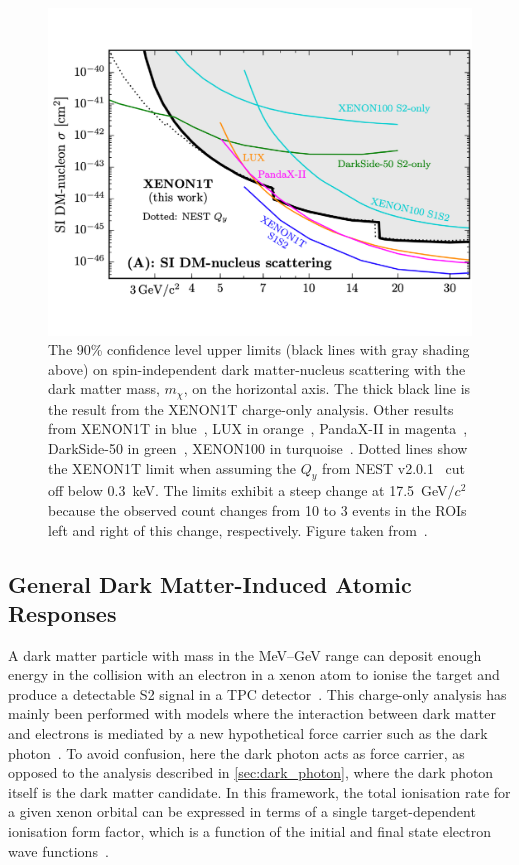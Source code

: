 \begin{figure}[!htbp] 
\begin{center}
\includegraphics[width=0.99\columnwidth]{fig_x1t_subGeV.pdf}
\caption{The 90\% confidence level upper limits (black lines with gray shading above) on spin-independent dark matter-nucleus scattering with the dark matter mass, $m_\chi$, on the horizontal axis. The thick black line is the result from the XENON1T charge-only analysis. Other results from XENON1T in blue~\cite{Aprile:2018dbl}, LUX in orange~\cite{Akerib:2016vxi}, PandaX-II in magenta~\cite{Ren:2018gyx}, DarkSide-50 in green~\cite{Agnes:2018ves}, XENON100 in turquoise~\cite{Aprile:2016wwo, Aprile:2016swn}. Dotted lines show the XENON1T limit when assuming the $Q_y$ from NEST v2.0.1~\cite{szydagis_m_2019_3357973} cut off below 0.3~keV. The limits exhibit a steep change at 17.5~GeV$/c^2$ because the observed count changes from 10 to 3 events in the ROIs left and right of this change, respectively. Figure taken from~\cite{Aprile:2019xxb}.}
\label{fig:sub_GeV}
\end{center} 
\end{figure}

\subsection{General Dark Matter-Induced Atomic Responses}\label{sec:genatomresp}

A dark matter particle with mass in the MeV--GeV range can deposit enough energy in the collision with an electron in a xenon atom to ionise the target and produce a detectable S2 signal in a TPC detector~\cite{Kopp:2009et,Essig:2011nj}. This charge-only analysis has mainly been performed with models where the interaction between dark matter and electrons is mediated by a new hypothetical force carrier such as the dark photon~\cite{Agnes:2018oej,Aprile:2019xxb}. To avoid confusion, here the dark photon acts as force carrier, as opposed to the analysis described in \autoref{sec:dark_photon}, where the dark photon itself is the dark matter candidate. In this framework, the total ionisation rate for a given xenon orbital can be expressed in terms of a single target-dependent ionisation form factor, which is a function of the initial and final state electron wave functions~\cite{Kopp:2009et,Essig:2011nj}.

